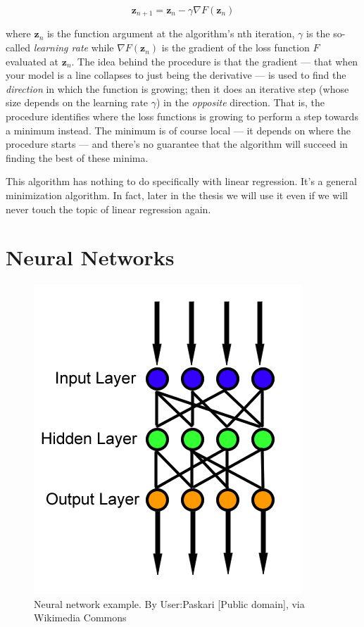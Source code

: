 \begin{equation}
  \boldsymbol{z}_{n+1} = \boldsymbol{z}_n - \gamma
  \nabla{F}(\boldsymbol{z}_n)
\end{equation}

where $\boldsymbol{z}_n$ is the function argument at the algorithm's
nth iteration, $\gamma$ is the so-called \emph{learning rate} while
$\nabla{F}(\boldsymbol{z}_n)$ is the gradient of the loss function $F$
evaluated at $\boldsymbol{z}_n$. The idea behind the procedure is that
the gradient --- that when your model is a line collapses to just
being the derivative --- is used to find the \emph{direction} in which
the function is growing; then it does an iterative step (whose size
depends on the learning rate $\gamma$) in the \emph{opposite}
direction. That is, the procedure identifies where the loss functions
is growing to perform a step towards a minimum instead. The minimum is
of course local --- it depends on where the procedure starts --- and
there's no guarantee that the algorithm will succeed in finding the
best of these minima.

This algorithm has nothing to do specifically with linear regression.
It's a general minimization algorithm. In fact, later in the thesis
we will use it even if we will never touch the topic of linear regression
again.

\section{Neural Networks}
\label{sec:neural-networks}

\begin{figure}
  \centering
  \includegraphics[width=0.5\linewidth]{wikipedia-neural-network.png}
  \caption{Neural network example. By User:Paskari [Public domain], via
    Wikimedia Commons}
  \label{fig:wikipedia-neural-network}
\end{figure}

